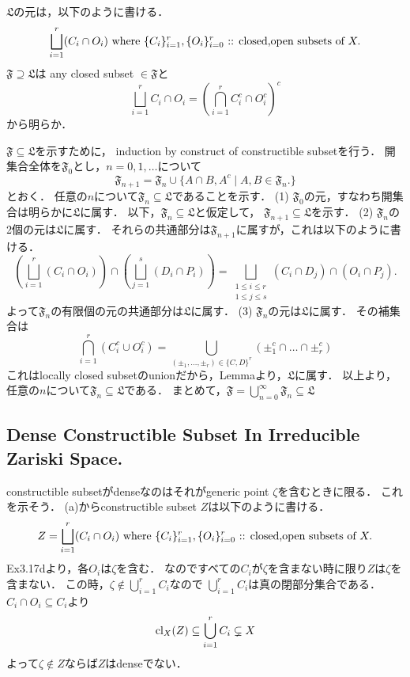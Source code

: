 \documentclass[a4paper]{jsarticle}
\begin{document}
    $\mathfrak{L}$の元は，以下のように書ける．
    \[
        \bigsqcup_{i=1}^r (C_i \cap O_i)
        \text{ where }
        \{C_i\}_{i=1}^r, \{O_i\}_{i=0}^r\text{ :: closed,open subsets of }X.
    \]
    $\mathfrak{F} \supseteq \mathfrak{L}$は
    any closed subset $\in \mathfrak{F}$と
    \[
        \bigsqcup_{i=1}^r C_i \cap O_i
        =\left(\bigcap_{i=1}^r C_i^c \cap O_i^c \right)^c
    \]
    から明らか．

    $\mathfrak{F} \subseteq \mathfrak{L}$を示すために，
    induction by construct of constructible subsetを行う．
    開集合全体を$\mathfrak{F}_0$とし，$n=0,1,\dots$について
    \[ \mathfrak{F}_{n+1}=\mathfrak{F}_{n} \cup \{A \cap B, A^c \mid A,B \in \mathfrak{F}_{n}. \} \]
    とおく．
    任意の$n$について$\mathfrak{F}_{n} \subseteq \mathfrak{L}$であることを示す．
    (1) $\mathfrak{F}_0$の元，すなわち開集合は明らかに$\mathfrak{L}$に属す．
    以下，$\mathfrak{F}_{n} \subseteq \mathfrak{L}$と仮定して，
    $\mathfrak{F}_{n+1} \subseteq \mathfrak{L}$を示す．
    (2) $\mathfrak{F}_{n}$の2個の元は$\mathfrak{L}$に属す．
    それらの共通部分は$\mathfrak{F}_{n+1}$に属すが，これは以下のように書ける．
    \[
        \left( \bigsqcup_{i=1}^r (C_i \cap O_i) \right) \cap \left( \bigsqcup_{j=1}^s (D_i \cap P_i) \right)
        =
        \bigsqcup_{\substack{1 \leq i \leq r \\ 1 \leq j \leq s}}
            (C_i \cap D_j) \cap (O_i \cap P_j).
    \]
    よって$\mathfrak{F}_{n}$の有限個の元の共通部分は$\mathfrak{L}$に属す．
    (3) $\mathfrak{F}_{n}$の元は$\mathfrak{L}$に属す．
    その補集合は
    \[
        \bigcap_{i=1}^r (C_i^c \cup O_i^c)
        =
        \bigcup_{(\pm_1,\dots,\pm_r) \in \{C,D\}^r} (\pm_1^c \cap \dots \cap \pm_r^c)
    \]
    これはlocally closed subsetのunionだから，Lemmaより，$\mathfrak{L}$に属す．
    以上より，任意の$n$について$\mathfrak{F}_{n} \subseteq \mathfrak{L}$である．
    まとめて，$\mathfrak{F} = \bigcup_{n=0}^{\infty} \mathfrak{F}_{n} \subseteq \mathfrak{L}$

    \subsection{Dense Constructible Subset In Irreducible Zariski Space.}
    constructible subsetがdenseなのはそれがgeneric point $\zeta$を含むときに限る．
    これを示そう．
    (a)からconstructible subset $Z$は以下のように書ける．
    \[
        Z=\bigsqcup_{i=1}^r (C_i \cap O_i)
        \text{ where }
        \{C_i\}_{i=1}^r, \{O_i\}_{i=0}^r\text{ :: closed,open subsets of }X.
    \]
    Ex3.17dより，各$O_i$は$\zeta$を含む．
    なのですべての$C_i$が$\zeta$を含まない時に限り$Z$は$\zeta$を含まない．
    この時，$\zeta \not \in \bigcup_{i=1}^r C_i$なので
    $\bigcup_{i=1}^r C_i$は真の閉部分集合である．
    $C_i \cap O_i \subseteq C_i$より
    \[ \operatorname{cl}_X(Z) \subseteq \bigcup_{i=1}^r C_i \subsetneq X \]
    よって$\zeta \not \in Z$ならば$Z$はdenseでない．
\end{document}

